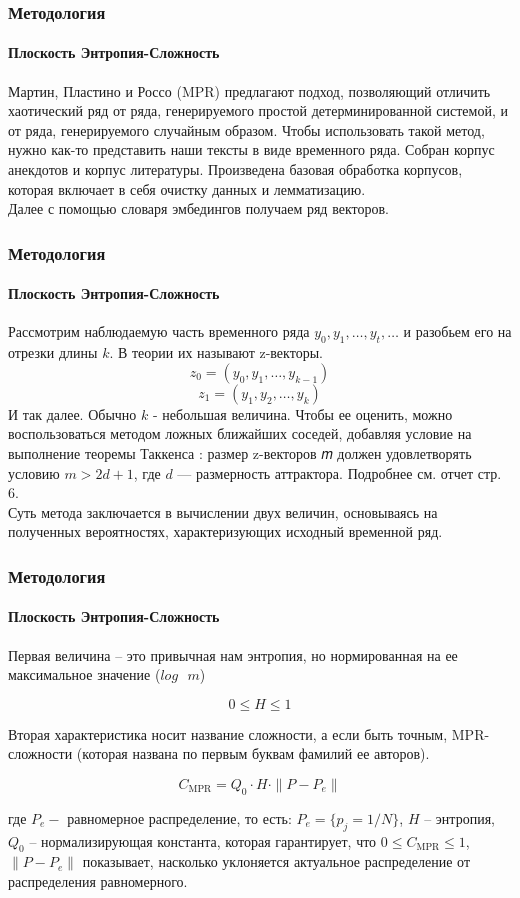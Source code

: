 \documentclass[aspectratio=169]{beamer}
\begin{document}
\begin{frame}
\frametitle{Методология}
\framesubtitle{Плоскость Энтропия-Сложность}

Мартин, Пластино и Россо (MPR) \cite{rosso_distinguishing_2007} предлагают подход, позволяющий отличить хаотический ряд от ряда, генерируемого простой детерминированной системой, и от ряда, генерируемого случайным образом. Чтобы использовать такой метод, нужно как-то представить наши тексты в виде временного ряда. Собран корпус анекдотов и корпус литературы. Произведена базовая обработка корпусов, которая включает в себя очистку данных и лемматизацию. \\
Далее с помощью словаря эмбедингов получаем ряд векторов. 
	
\end{frame}

\begin{frame}
\frametitle{Методология}
\framesubtitle{Плоскость Энтропия-Сложность}
	Рассмотрим наблюдаемую часть временного ряда $ y_0, y_1, \dots, y_t, \dots $ и разобьем его на отрезки длины $k$. В теории их называют z-векторы.
	$$ 
	z_0 = (y_0, y_1, \dots, y_{k-1}) 
	$$
	$$
	z_1 = (y_1, y_2, \dots, y_{k}) 
	$$
	И так далее. Обычно $k$ - небольшая величина. Чтобы ее оценить, можно воспользоваться методом ложных ближайших соседей, добавляя условие на выполнение теоремы Таккенса \cite{rand_detecting_takkens_1981}: размер z-векторов 𝑚 должен удовлетворять условию $m > 2d + 1$, где $d$ — размерность аттрактора. Подробнее см. отчет стр. 6.  \\
	Суть метода заключается в вычислении двух величин, основываясь на полученных вероятностях, характеризующих исходный временной ряд.

\end{frame}

\begin{frame}
\frametitle{Методология}
\framesubtitle{Плоскость Энтропия-Сложность}
	Первая величина -- это привычная нам энтропия, но нормированная на ее максимальное значение ($log \text{ } m$)
	
	$$
	0 \leq H \leq 1 
	$$
	
	Вторая характеристика носит название сложности, а если быть точным, MPR-сложности (которая названа по первым буквам фамилий ее авторов).

	$$ 
	C_{\text{MPR}} = Q_0 \cdot H \cdot \|P - P_e\| 
	$$
	
	где $P_e - $ равномерное распределение, то есть: $P_e = \{p_j = 1/N\}$, $H$ -- энтропия, \\ $ Q_0$ -- нормализирующая константа, которая гарантирует, что $0 \leq C_{\text{MPR}} \leq 1$, $\|P - P_e\|$ показывает, насколько уклоняется актуальное распределение от распределения равномерного.
\end{frame}
\end{document}
